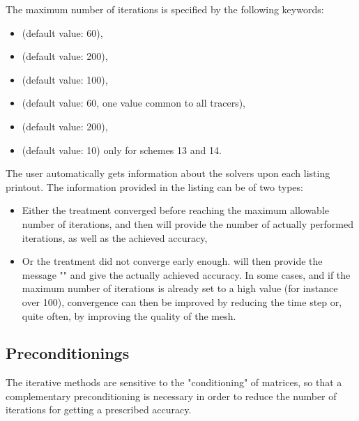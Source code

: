 The maximum number of iterations is specified by the following keywords:

\begin{itemize}
\item {}(default value: 60),

\item {} (default value:
200),

\item {} (default value: 100),

%
\item {}(default
value: 60, one value common to all tracers),

\item {}(default
value: 200),

\item {}(default
value: 10) only for schemes 13 and 14.
\end{itemize}

The user automatically gets information about the solvers upon each listing
printout. The information provided in the listing can be of two types:

\begin{itemize}
\item Either the treatment converged before reaching the maximum allowable
number of iterations, and then  will provide the number of actually
performed iterations, as well as the achieved accuracy,

\item Or the treatment did not converge early enough.  will then
provide the message "" and give
the actually achieved accuracy. In some cases, and if the maximum number of
iterations is already set to a high value (for instance over 100), convergence
can then be improved by reducing the time step or, quite often, by improving
the quality of the mesh.
\end{itemize}


\subsection{Preconditionings}
\label{sec:precond}
The iterative methods are sensitive to the "conditioning" of matrices, so that
a complementary preconditioning is necessary in order to reduce the number of
iterations for getting a prescribed accuracy.

